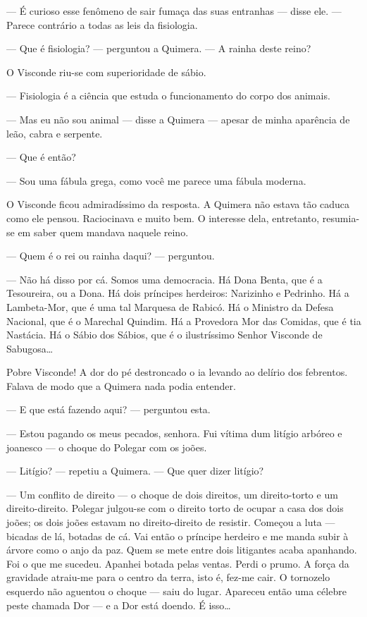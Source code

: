 --- É curioso esse fenômeno de sair fumaça das suas entranhas --- disse
ele. --- Parece contrário a todas as leis da fisiologia.

--- Que é fisiologia? --- perguntou a Quimera. --- A rainha deste reino?

O Visconde riu-se com superioridade de sábio.

--- Fisiologia é a ciência que estuda o funcionamento do corpo dos
animais.

--- Mas eu não sou animal --- disse a Quimera --- apesar de minha
aparência de leão, cabra e serpente.

--- Que é então?

--- Sou uma fábula grega, como você me parece uma fábula moderna.

O Visconde ficou admiradíssimo da resposta. A Quimera não estava tão
caduca como ele pensou. Raciocinava e muito bem. O interesse dela,
entretanto, resumia-se em saber quem mandava naquele reino.

--- Quem é o rei ou rainha daqui? --- perguntou.

--- Não há disso por cá. Somos uma democracia. Há Dona Benta, que é a
Tesoureira, ou a Dona. Há dois príncipes herdeiros: Narizinho e
Pedrinho. Há a Lambeta-Mor, que é uma tal Marquesa de Rabicó. Há o
Ministro da Defesa Nacional, que é o Marechal Quindim. Há a Provedora
Mor das Comidas, que é tia Nastácia. Há o Sábio dos Sábios, que é o
ilustríssimo Senhor Visconde de Sabugosa\ldots{}

Pobre Visconde! A dor do pé destroncado o ia levando ao delírio dos
febrentos. Falava de modo que a Quimera nada podia entender.

--- E que está fazendo aqui? --- perguntou esta.

--- Estou pagando os meus pecados, senhora. Fui vítima dum litígio
arbóreo e joanesco --- o choque do Polegar com os joões.

--- Litígio? --- repetiu a Quimera. --- Que quer dizer litígio?

--- Um conflito de direito --- o choque de dois direitos, um
direito-torto e um direito-direito. Polegar julgou-se com o direito
torto de ocupar a casa dos dois joões; os dois joões estavam no
direito-direito de resistir. Começou a luta --- bicadas de lá, botadas
de cá. Vai então o príncipe herdeiro e me manda subir à árvore como o
anjo da paz. Quem se mete entre dois litigantes acaba apanhando. Foi o
que me sucedeu. Apanhei botada pelas ventas. Perdi o prumo. A força da
gravidade atraiu-me para o centro da terra, isto é, fez-me cair. O
tornozelo esquerdo não aguentou o choque --- saiu do lugar. Apareceu
então uma célebre peste chamada Dor --- e a Dor está doendo. É
isso\ldots{}

